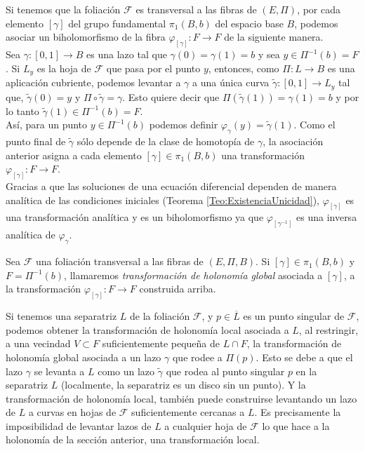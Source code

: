 Si tenemos que la foliación $\mathcal{F}$ es transversal a las fibras de $(E,\Pi)$, por cada elemento $[\gamma]$ del grupo fundamental $\pi_{1}(B,b)$ del espacio base $B$, podemos asociar un biholomorfismo de la fibra $\varphi_{[\gamma]}\colon F\rightarrow F$ de la siguiente manera.\\

Sea $\gamma\colon [0,1]\rightarrow B$ es una lazo tal que $\gamma(0)=\gamma(1)=b$ y sea $y\in\Pi^{-1}(b)=F$. Si $L_{y}$ es la hoja de $\mathcal{F}$ que pasa por el punto $y$, entonces, como $\Pi\colon L \rightarrow B $ es una aplicación cubriente, podemos levantar a $\gamma$ a una única curva $\tilde{\gamma}\colon [0,1] \rightarrow L_{y}$ tal que, $\tilde{\gamma}(0)=y$ y $\Pi\circ\tilde{\gamma}=\gamma$. Esto quiere decir que $\Pi(\tilde{\gamma}(1))=\gamma(1)=b$ y por lo tanto $\tilde{\gamma}(1)\in\Pi^{-1}(b)=F$.\\

Así, para un punto $y\in\Pi^{-1}(b)$ podemos definir $\varphi_{\gamma}(y)=\tilde{\gamma}(1)$. Como el punto final de $\tilde{\gamma}$ sólo depende de la clase de homotopía de $\gamma$, la asociación anterior asigna a cada elemento $[\gamma]\in\pi_{1}(B,b)$ una transformación $\varphi_{[\gamma]}\colon F\rightarrow F$.\\

Gracias a que las soluciones de una ecuación diferencial dependen de manera analítica de las condiciones iniciales (Teorema \ref{Teo:ExistenciaUnicidad}), $\varphi_{[\gamma]}$ es una transformación analítica y es un biholomorfismo ya que $\varphi_{[\gamma^{-1}]}$ es una inversa analítica de $\varphi_{\gamma}$.\\

\begin{defn}
\label{Def:HolonomiaGlobal}
Sea $\mathcal{F}$ una foliación transversal a las fibras de $(E,\Pi,B)$. Si $[\gamma]\in\pi_{1}(B,b)$ y $F=\Pi^{-1}(b)$, llamaremos \emph{transformación de holonomía global} asociada a $[\gamma]$, a la transformación $\varphi_{[\gamma]}\colon F\rightarrow F$ construida arriba. 
\end{defn}

Si tenemos una separatriz $L$ de la foliación $\mathcal{F}$, y $p\in\overline{L}$ es un punto singular de $\mathcal{F}$, podemos obtener la transformación de holonomía local asociada a $L$, al restringir, a una vecindad $V\subset F$ suficientemente pequeña de $L\cap F$, la transformación de holonomía global asociada a un lazo $\gamma$ que rodee a $\Pi(p)$. Esto se debe a que el lazo $\gamma$ se levanta a $L$ como un lazo $\tilde{\gamma}$ que rodea al punto singular $p$ en la separatriz $L$ (localmente, la separatriz es un disco sin un punto). Y la transformación de holonomía local, también puede construirse levantando un lazo de $L$ a curvas en hojas de $\mathcal{F}$ suficientemente cercanas a $L$. Es precisamente la imposibilidad de levantar lazos de $L$ a cualquier hoja de $\mathcal{F}$ lo que hace a la holonomía de la sección anterior, una transformación local.\\

